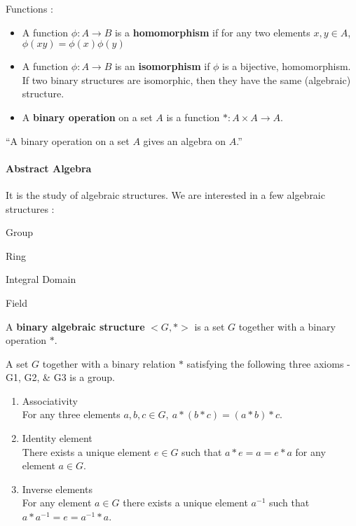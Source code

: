 \begin{definition} Functions :
	\begin{itemize}
		\item A function $\phi : A \to B$ is a \textbf{homomorphism} if for any two elements $x,y \in A$, $\phi (xy) = \phi(x)\phi(y)$%
		\item A function $\phi : A \to B$ is an \textbf{isomorphism} if $\phi$ is a bijective, homomorphism. If two binary structures  are isomorphic, then they have the same (algebraic) structure.%
		\item A \textbf{binary operation} on a set $A$ is a function $\ast : A \times A \to A$. %
	\end{itemize}
\end{definition}

``A binary operation on a set $A$ gives an algebra on $A$.'' %
\begin{story}
\paragraph{Abstract Algebra}
	It is the study of algebraic structures. We are interested in a few algebraic structures :
	\begin{enumerate*}
		\item Group
		\item Ring
		\item Integral Domain
		\item Field
	\end{enumerate*}
\end{story}

\begin{definition}
	A \textbf{binary algebraic structure} $<\!G,\ast\!>$ is a set $G$ together with a binary operation $\ast$.
\end{definition}

\begin{definition}[Group]
	A set $G$ together with a binary relation $\ast$ satisfying the following three axioms -G1, G2, \& G3 is a group.%
\begin{enumerate}[label=G\arabic*]
	\item Associativity \\ For any three elements $a,b,c \in G,\ a \ast (b \ast c) = (a \ast b) \ast c$.
	\item Identity element \\There exists a unique element $e \in G$ such that $a \ast e = a = e \ast a$ for any element $a \in G$.
	\item Inverse elements \\For any element $a \in G$ there exists a unique element $a^{-1}$ such that $a \ast a^{-1} = e = a^{-1} \ast a$.
\end{enumerate}
\end{definition}

